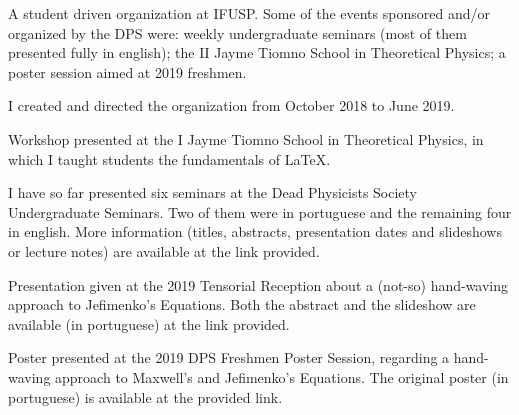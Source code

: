 \documentclass[10pt,a4paper,ragged2e, normalphoto]{altacv}
\begin{document}
\begin{fullwidth}

A student driven organization at IFUSP. Some of the events sponsored and/or organized by the DPS were: weekly undergraduate seminars (most of them presented fully in english); the II Jayme Tiomno School in Theoretical Physics; a poster session aimed at 2019 freshmen.

I created and directed the organization from October 2018 to June 2019. 


Workshop presented at the I Jayme Tiomno School in Theoretical Physics, in which I taught students the fundamentals of \LaTeX. 

\divider

I have so far presented six seminars at the Dead Physicists Society Undergraduate Seminars. Two of them were in portuguese and the remaining four in english. More information (titles, abstracts, presentation dates and slideshows or lecture notes) are available at the link provided. 

\divider

Presentation given at the 2019 Tensorial Reception about a (not-so) hand-waving approach to Jefimenko's Equations. Both the abstract and the slideshow are available (in portuguese) at the link provided.

\divider

Poster presented at the 2019 DPS Freshmen Poster Session, regarding a hand-waving approach to Maxwell's and Jefimenko's Equations. The original poster (in portuguese) is available at the provided link.

\end{fullwidth}
\end{document}
